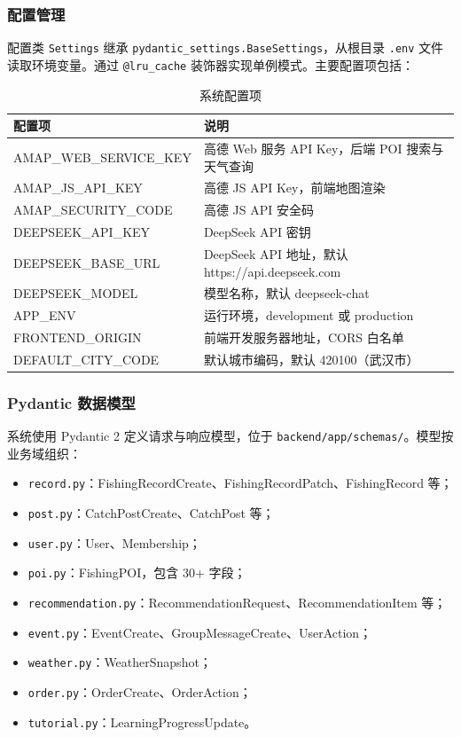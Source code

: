 \documentclass[12pt,a4paper]{ctexart}
\begin{document}
\subsubsection{配置管理}

配置类 \texttt{Settings} 继承 \texttt{pydantic\_settings.BaseSettings}，从根目录 \texttt{.env} 文件读取环境变量。通过 \texttt{@lru\_cache} 装饰器实现单例模式。主要配置项包括：

\begin{table}[H]
  \centering
  \caption{系统配置项}
  \label{tab:config}
  \begin{tabular}{p{4.5cm}p{7.5cm}}
    \toprule
    \textbf{配置项} & \textbf{说明} \\
    \midrule
    AMAP\_WEB\_SERVICE\_KEY & 高德 Web 服务 API Key，后端 POI 搜索与天气查询 \\
    AMAP\_JS\_API\_KEY & 高德 JS API Key，前端地图渲染 \\
    AMAP\_SECURITY\_CODE & 高德 JS API 安全码 \\
    DEEPSEEK\_API\_KEY & DeepSeek API 密钥 \\
    DEEPSEEK\_BASE\_URL & DeepSeek API 地址，默认 https://api.deepseek.com \\
    DEEPSEEK\_MODEL & 模型名称，默认 deepseek-chat \\
    APP\_ENV & 运行环境，development 或 production \\
    FRONTEND\_ORIGIN & 前端开发服务器地址，CORS 白名单 \\
    DEFAULT\_CITY\_CODE & 默认城市编码，默认 420100（武汉市） \\
    \bottomrule
  \end{tabular}
\end{table}

\subsubsection{Pydantic 数据模型}

系统使用 Pydantic 2 定义请求与响应模型，位于 \texttt{backend/app/schemas/}。模型按业务域组织：
\begin{itemize}
  \item \texttt{record.py}：FishingRecordCreate、FishingRecordPatch、FishingRecord 等；
  \item \texttt{post.py}：CatchPostCreate、CatchPost 等；
  \item \texttt{user.py}：User、Membership；
  \item \texttt{poi.py}：FishingPOI，包含 30+ 字段；
  \item \texttt{recommendation.py}：RecommendationRequest、RecommendationItem 等；
  \item \texttt{event.py}：EventCreate、GroupMessageCreate、UserAction；
  \item \texttt{weather.py}：WeatherSnapshot；
  \item \texttt{order.py}：OrderCreate、OrderAction；
  \item \texttt{tutorial.py}：LearningProgressUpdate。
\end{itemize}
\end{document}
